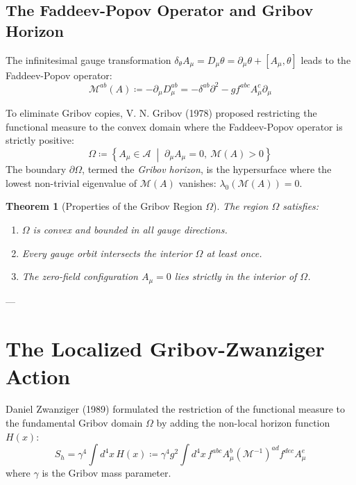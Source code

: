 \documentclass[11pt,a4paper]{article}
\newtheorem{theorem}{Theorem}[section]
\theoremstyle{definition}
\begin{document}
\subsection{The Faddeev-Popov Operator and Gribov Horizon}
The infinitesimal gauge transformation $\delta_\theta A_\mu = D_\mu \theta = \partial_\mu \theta + [A_\mu, \theta]$ leads to the Faddeev-Popov operator:
\begin{equation}
\mathcal{M}^{ab}(A) \coloneqq -\partial_\mu D_\mu^{ab} = -\delta^{ab} \partial^2 - g f^{abc} A_\mu^c \partial_\mu
\end{equation}

To eliminate Gribov copies, V. N. Gribov (1978) proposed restricting the functional measure to the convex domain where the Faddeev-Popov operator is strictly positive:
\begin{equation}
\Omega \coloneqq \left\{ A_\mu \in \mathcal{A} \;\middle|\; \partial_\mu A_\mu = 0, \ \mathcal{M}(A) > 0 \right\}
\end{equation}
The boundary $\partial \Omega$, termed the \emph{Gribov horizon}, is the hypersurface where the lowest non-trivial eigenvalue of $\mathcal{M}(A)$ vanishes: $\lambda_0(\mathcal{M}(A)) = 0$.

\begin{theorem}[Properties of the Gribov Region $\Omega$]
The region $\Omega$ satisfies:
\begin{enumerate}
    \item $\Omega$ is convex and bounded in all gauge directions.
    \item Every gauge orbit intersects the interior $\Omega$ at least once.
    \item The zero-field configuration $A_\mu = 0$ lies strictly in the interior of $\Omega$.
\end{enumerate}
\end{theorem}

---

\section{The Localized Gribov-Zwanziger Action}
Daniel Zwanziger (1989) formulated the restriction of the functional measure to the fundamental Gribov domain $\Omega$ by adding the non-local horizon function $H(x)$:
\begin{equation}
S_h = \gamma^4 \int d^4x \, H(x) \coloneqq \gamma^4 g^2 \int d^4x \, f^{abc} A_\mu^b (\mathcal{M}^{-1})^{ad} f^{dec} A_\mu^e
\end{equation}
where $\gamma$ is the Gribov mass parameter.
\end{document}
